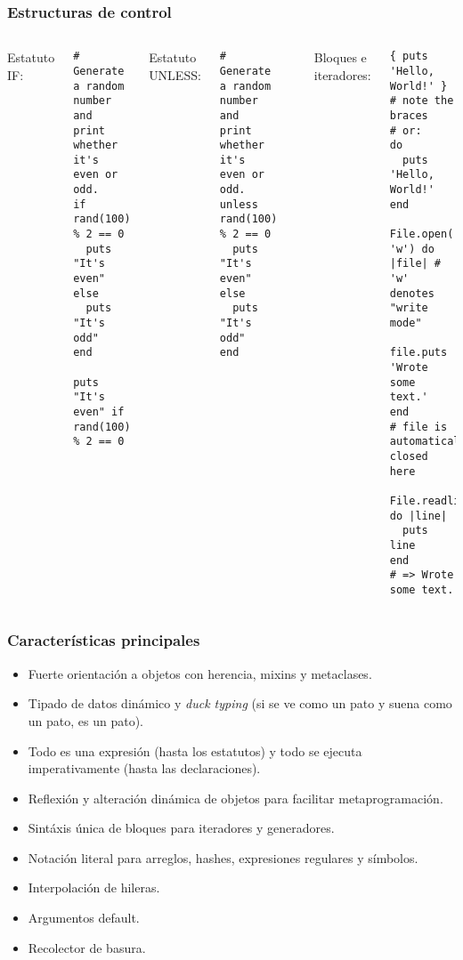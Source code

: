 \documentclass{beamer}
\begin{document}
\begin{frame}[fragile]
\frametitle{Estructuras de control}
\begin{columns}[c] %

Estatuto IF:
\begin{lstlisting}
# Generate a random number and print whether it's even or odd.
if rand(100) % 2 == 0
  puts "It's even"
else
  puts "It's odd"
end

puts "It's even" if rand(100) % 2 == 0
\end{lstlisting}

Estatuto UNLESS:
\begin{lstlisting}
# Generate a random number and print whether it's even or odd.
unless rand(100) % 2 == 0
  puts "It's even"
else
  puts "It's odd"
end
\end{lstlisting}

\frametitle{}
Bloques e iteradores:
\begin{lstlisting}
{ puts 'Hello, World!' } # note the braces
# or:
do
  puts 'Hello, World!'
end

File.open('file.txt', 'w') do |file| # 'w' denotes "write mode"
  file.puts 'Wrote some text.'
end                                  # file is automatically closed here

File.readlines('file.txt').each do |line|
  puts line
end
# => Wrote some text.
\end{lstlisting}
\end{columns}
\end{frame}


\begin{frame}
\frametitle{Caracter\'isticas principales}
\begin{itemize}
  \item Fuerte orientaci\'on a objetos con herencia, mixins y metaclases.
  \item Tipado de datos din\'amico y \emph{duck typing} (si se ve como un pato y suena como un pato, es un pato).
  \item Todo es una expresi\'on (hasta los estatutos) y todo se ejecuta imperativamente (hasta las declaraciones).
  \item Reflexi\'on y alteraci\'on din\'amica de objetos para facilitar metaprogramaci\'on.
  \item Sint\'axis \'unica de bloques para iteradores y generadores.
  \item Notaci\'on literal para arreglos, hashes, expresiones regulares y s\'imbolos.
  \item Interpolaci\'on de hileras.
  \item Argumentos default.
  \item Recolector de basura.
\end{itemize}
\end{frame}
\end{document}
